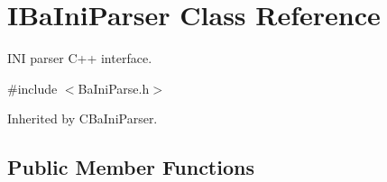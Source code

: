 \hypertarget{classIBaIniParser}{}\section{I\+Ba\+Ini\+Parser Class Reference}
\label{classIBaIniParser}


I\+N\+I parser C++ interface.  




{\ttfamily \#include $<$Ba\+Ini\+Parse.\+h$>$}



Inherited by C\+Ba\+Ini\+Parser.

\subsection*{Public Member Functions}
